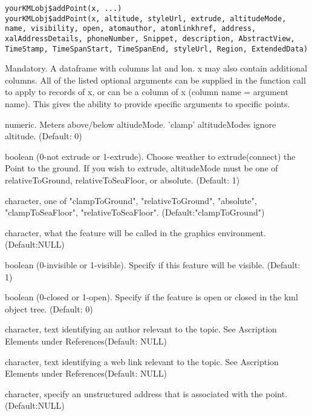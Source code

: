 \documentclass[a4paper]{book}
\begin{document}
%
\begin{Usage}
\begin{verbatim}
yourKMLobj$addPoint(x, ...)
yourKMLobj$addPoint(x, altitude, styleUrl, extrude, altitudeMode, name, visibility, open, atomauthor, atomlinkhref, address, xalAddressDetails, phoneNumber, Snippet, description, AbstractView, TimeStamp, TimeSpanStart, TimeSpanEnd, styleUrl, Region, ExtendedData)
\end{verbatim}
\end{Usage}
%
\begin{Arguments}
\begin{ldescription}

\item[\code{x}] Mandatory. A dataframe with columns lat and lon. x may also contain additional columns. All of the listed optional arguments can be supplied in the function call to apply to records of x, or can be a column of x (column name = argument name). This gives the ability to provide specific arguments to specific points.  
\item[\code{altitude}] numeric. Meters above/below altiudeMode. 'clamp' altitudeModes ignore altitude. (Default: 0)
\item[\code{extrude}] boolean (0-not extrude or 1-extrude). Choose weather to extrude(connect) the Point to the ground. If you wish to extrude, altitudeMode must be one of relativeToGround, relativeToSeaFloor, or absolute. (Default: 1)
\item[\code{altitudeMode}] character, one of "clampToGround", "relativeToGround", "absolute", "clampToSeaFloor", "relativeToSeaFloor". (Default:"clampToGround")
\item[\code{name}] character, what the feature will be called in the graphics environment. (Default:NULL) 
\item[\code{visibility}] boolean (0-invisible or 1-visible). Specify if this feature will be visible. (Default: 1)
\item[\code{open}]  boolean (0-closed or 1-open). Specify if the feature is open or closed in the kml object tree. (Default: 0)
\item[\code{atomauthor}]  character, text identifying an author relevant to the topic. See Ascription Elements under References(Default: NULL) 
\item[\code{atomlinkhref}] character, text identifying a web link relevant to the topic. See Ascription Elements under References(Default: NULL) 
\item[\code{address}] character, specify an unstructured address that is associated with the point. (Default:NULL) 

\end{ldescription}
\end{Arguments}
\end{document}
